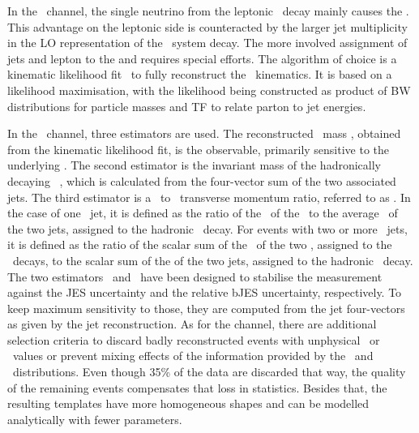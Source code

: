 In the \ttbarlj\ channel, the single neutrino from the leptonic \Wboson\ decay mainly causes the \met. 
%
This advantage on the leptonic side is counteracted by the larger jet multiplicity in the \gls{LO} representation of the \ttbar\ system decay. The more involved assignment of jets and lepton to the  and  requires special efforts.
%
The algorithm of choice is a kinematic likelihood fit~\cite{ATL-2012-Mass,KLFitterNIM} to fully reconstruct the \ttbarlj\ kinematics. 
%
It is based on a likelihood maximisation, with the likelihood being constructed as product of \gls{BW} distributions for particle masses and \gls{TF} to relate parton to jet energies. 




In the \ttbarlj\ channel, three estimators are used. The reconstructed \tquark\ mass \mtr, obtained from the kinematic likelihood fit, is the observable, primarily sensitive to the underlying \mt. 
%
The second estimator is the invariant mass of the hadronically decaying \Wboson\ \mWr, which is calculated from the four-vector sum of the two associated jets. 
%
The third estimator is a \bjet\ to \ljet\ transverse momentum ratio, referred to as \rbqr. 
%
In the case of one \btagged\ jet, it is defined as the ratio of the \pt\ of the \bjet\ to the average \pt\ of the two jets, assigned to the hadronic \Wboson\ decay. 
%
For events with two or more \btagged\ jets, it is defined as the ratio of the scalar sum of the \pt\ of the two , assigned to the \tquark\ decays, to the scalar sum of the \pt of the two jets, assigned to the hadronic \Wboson\ decay. 
%
The two estimators \mWr\ and \rbqr\ have been designed to stabilise the measurement against the \gls{JES} uncertainty and the relative \gls{bJES} uncertainty, respectively. 
%
To keep maximum sensitivity to those, they are computed from the jet four-vectors as given by the jet reconstruction. 
%
As for the \ttbarll channel, there are additional selection criteria to discard badly reconstructed events with unphysical \mtr\ or \mWr\ values or prevent mixing effects of the information provided by the \mWr\ and \rbqr\ distributions.
%
Even though 35\% of the data are discarded that way, the quality of the remaining events compensates that loss in statistics. 
%
Besides that, the resulting templates have more homogeneous shapes and can be modelled analytically with fewer parameters.




